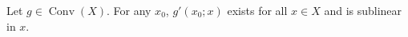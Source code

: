 Let $g\in\operatorname{Conv}(X)$. For any $x_0$, $g'(x_0;x)$ exists for all $x\in X$ and is sublinear in $x$.
